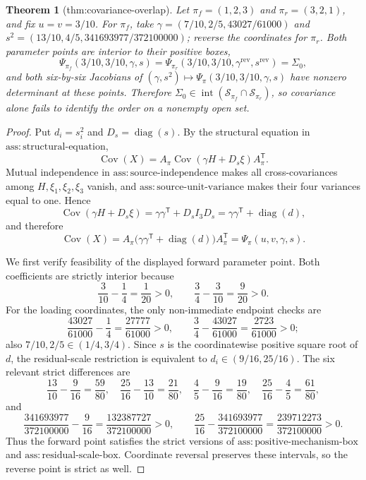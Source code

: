 \documentclass{article}
\newtheorem{theorem}{Theorem}
\begin{document}
\begin{theorem}[thm:covariance-overlap]\label{thm:covariance-overlap}
Let \(\pi_f=(1,2,3)\) and \(\pi_r=(3,2,1)\), and fix \(u=v=3/10\). For \(\pi_f\), take \(\gamma=(7/10,2/5,43027/61000)\) and \(s^2=(13/10,4/5,341693977/372100000)\); reverse the coordinates for \(\pi_r\). Both parameter points are interior to their positive boxes, \[\Psi_{\pi_f}(3/10,3/10,\gamma,s)=\Psi_{\pi_r}(3/10,3/10,\gamma^{\mathrm{rev}},s^{\mathrm{rev}})=\Sigma_0,\] and both six-by-six Jacobians of \((\gamma,s^2)\mapsto\Psi_\pi(3/10,3/10,\gamma,s)\) have nonzero determinant at these points. Therefore \(\Sigma_0\in\operatorname{int}(\mathcal S_{\pi_f}\cap\mathcal S_{\pi_r})\), so covariance alone fails to identify the order on a nonempty open set.
\end{theorem}
\begin{proof}
Put \(d_i=s_i^2\) and \(D_s=\operatorname{diag}(s)\).  By the structural equation in \(\mathrm{ass{:}structural\text{-}equation}\),
\[
 \operatorname{Cov}(X)
 =A_\pi\operatorname{Cov}(\gamma H+D_s\xi)A_\pi^{\mathsf T}.
\]
Mutual independence in \(\mathrm{ass{:}source\text{-}independence}\) makes all cross-covariances among \(H,\xi_1,\xi_2,\xi_3\) vanish, and \(\mathrm{ass{:}source\text{-}unit\text{-}variance}\) makes their four variances equal to one.  Hence
\[
 \operatorname{Cov}(\gamma H+D_s\xi)
 =\gamma\gamma^{\mathsf T}+D_s I_3D_s
 =\gamma\gamma^{\mathsf T}+\operatorname{diag}(d),
\]
and therefore
\[
 \operatorname{Cov}(X)
 =A_\pi\bigl(\gamma\gamma^{\mathsf T}+\operatorname{diag}(d)\bigr)A_\pi^{\mathsf T}
 =\Psi_\pi(u,v,\gamma,s).
 \tag{1}
\]

We first verify feasibility of the displayed forward parameter point.  Both coefficients are strictly interior because
\[
 \frac{3}{10}-\frac14=\frac1{20}>0,
 \qquad
 \frac34-\frac{3}{10}=\frac9{20}>0.
\]
For the loading coordinates, the only non-immediate endpoint checks are
\[
 \frac{43027}{61000}-\frac14=\frac{27777}{61000}>0,
 \qquad
 \frac34-\frac{43027}{61000}=\frac{2723}{61000}>0;
\]
also \(7/10,2/5\in(1/4,3/4)\).  Since \(s\) is the coordinatewise positive square root of \(d\), the residual-scale restriction is equivalent to \(d_i\in(9/16,25/16)\).  The six relevant strict differences are
\[
 \frac{13}{10}-\frac9{16}=\frac{59}{80},\quad
 \frac{25}{16}-\frac{13}{10}=\frac{21}{80},\quad
 \frac45-\frac9{16}=\frac{19}{80},\quad
 \frac{25}{16}-\frac45=\frac{61}{80},
\]
and
\[
 \frac{341693977}{372100000}-\frac9{16}
 =\frac{132387727}{372100000}>0,
 \qquad
 \frac{25}{16}-\frac{341693977}{372100000}
 =\frac{239712273}{372100000}>0.
\]
Thus the forward point satisfies the strict versions of \(\mathrm{ass{:}positive\text{-}mechanism\text{-}box}\) and \(\mathrm{ass{:}residual\text{-}scale\text{-}box}\).  Coordinate reversal preserves these intervals, so the reverse point is strict as well.


\end{proof}
\end{document}
